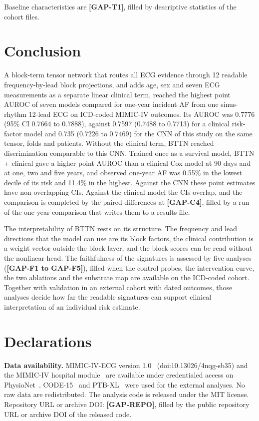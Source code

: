 \documentclass[preprint,12pt]{elsarticle}
\begin{document}
Baseline characteristics are \textbf{[GAP-T1]}, filled by descriptive statistics of the cohort files.

\section{Conclusion}

A block-term tensor network that routes all ECG evidence through 12 readable frequency-by-lead block projections, and adds age, sex and seven ECG measurements as a separate linear clinical term, reached the highest point AUROC of seven models compared for one-year incident AF from one sinus-rhythm 12-lead ECG on ICD-coded MIMIC-IV outcomes. Its AUROC was 0.7776 (95\% CI 0.7664 to 0.7888), against 0.7597 (0.7488 to 0.7713) for a clinical risk-factor model and 0.735 (0.7226 to 0.7469) for the CNN of this study on the same tensor, folds and patients. Without the clinical term, BTTN reached discrimination comparable to this CNN. Trained once as a survival model, BTTN + clinical gave a higher point AUROC than a clinical Cox model at 90 days and at one, two and five years, and observed one-year AF was 0.55\% in the lowest decile of its risk and 11.4\% in the highest. Against the CNN these point estimates have non-overlapping CIs. Against the clinical model the CIs overlap, and the comparison is completed by the paired differences at \textbf{[GAP-C4]}, filled by a run of the one-year comparison that writes them to a results file.

The interpretability of BTTN rests on its structure. The frequency and lead directions that the model can use are its block factors, the clinical contribution is a weight vector outside the block layer, and the block scores can be read without the nonlinear head. The faithfulness of the signatures is assessed by five analyses (\textbf{[GAP-F1 to GAP-F5]}), filled when the control probes, the intervention curve, the two ablations and the substrate map are available on the ICD-coded cohort. Together with validation in an external cohort with dated outcomes, those analyses decide how far the readable signatures can support clinical interpretation of an individual risk estimate.

\section*{Declarations}

\textbf{Data availability.} MIMIC-IV-ECG version 1.0~\cite{gow2023} (doi:10.13026/4nqg-sb35) and the MIMIC-IV hospital module~\cite{johnson2023} are available under credentialed access on PhysioNet~\cite{goldberger2000}. CODE-15~\cite{ribeiro2021code15} and PTB-XL~\cite{wagner2020} were used for the external analyses. No raw data are redistributed. The analysis code is released under the MIT license. Repository URL or archive DOI: \textbf{[GAP-REPO]}, filled by the public repository URL or archive DOI of the released code.
\end{document}
